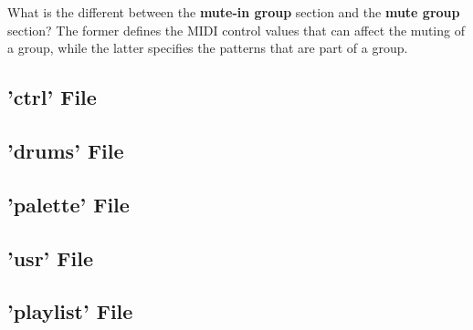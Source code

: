    What is the different between the \textbf{mute-in group}
   section and the \textbf{mute group} section?  The former defines the MIDI
   control values that can affect the muting of a group, while the latter
   specifies the patterns that are part of a group.

\subsection{'ctrl' File}
\label{subsec:configuration_ctrl}

\subsection{'drums' File}
\label{subsec:configuration_drums}

\subsection{'palette' File}
\label{subsec:configuration_palette}

\subsection{'usr' File}
\label{subsec:configuration_usr}

\subsection{'playlist' File}
\label{subsec:configuration_playlist}


